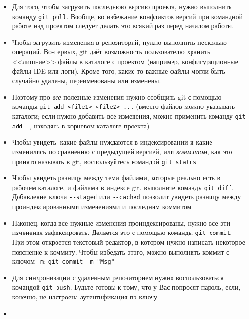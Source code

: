 \documentclass{beamer}
\begin{document}
\begin{frame}
	\begin{itemize}
		\item{Для того, чтобы загрузить последнюю версию проекта, нужно выполнить команду \texttt{git pull}. Вообще, во избежание конфликтов версий при командной работе над проектом следует делать это всякий раз перед началом работы.}\pause
		\item{Чтобы загрузить изменения в репозиторий, нужно выполнить несколько операций. Во-первых, git даёт возможность пользователю хранить <<лишние>> файлы в каталоге с проектом (например, конфигурационные файлы IDE или логи). Кроме того, какие-то важные файлы могли быть случайно удалены, переименованы или изменены.}\pause
		\item{Поэтому про \emph{все} полезные изменения нужно сообщить git с помощью команды \texttt{git add <file1> <file2> ...} (вместо файлов можно указывать каталоги; если нужно добавить все изменения, можно применить команду \texttt{git add .}, находясь в корневом каталоге проекта)}
	\end{itemize}
\end{frame}

\begin{frame}
	\begin{itemize}
		\item{Чтобы увидеть, какие файлы нуждаются в индексировании и какие изменились по сравнению с предыдущей версией, или \emph{коммитом}, как это принято называть в git, воспользуйтесь командой \texttt{git status}}\pause
		\item{Чтобы увидеть разницу между теми файлами, которые реально есть в рабочем каталоге, и файлами в индексе git, выполните команду \texttt{git diff}. Добавление ключа \texttt{-{}-staged} или \texttt{-{}-cached} позволит увидеть разницу между проиндексированными изменениями и последним коммитом}\pause
		\item{Наконец, когда все нужные изменения проиндексированы, нужно все эти изменения зафиксировать. Делается это с помощью команды \texttt{git commit}. При этом откроется текстовый редактор, в котором нужно написать некоторое пояснение к коммиту. Чтобы избедать этого, можно выполнить коммит с ключом \texttt{-m}: \texttt{git commit -m "Msg"}}
	\end{itemize}
\end{frame}

\begin{frame}
	\begin{itemize}
		\item{Для синхронизации с удалённым репозиторием нужно воспользоваться командой \texttt{git push}. Будьте готовы к тому, что у Вас попросят пароль, если, конечно, не настроена аутентификация по ключу}\pause
		\item{}
	\end{itemize}
\end{frame}
\end{document}
